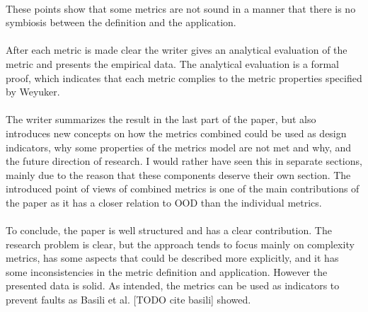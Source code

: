 \paragraph{}
These points show that some metrics are not sound in a manner that there is no symbiosis between the definition and
the application.

\paragraph{}
After each metric is made clear the writer gives an analytical evaluation of the metric and presents the empirical
data. The analytical evaluation is a formal proof, which indicates that each metric complies to the metric properties
specified by Weyuker.

\paragraph{}
The writer summarizes the result in the last part of the paper, but also introduces new concepts on how the metrics
combined could be used as design indicators, why some properties of the metrics model are not met and why, and the
future direction of research. I would rather have seen this in separate sections, mainly due to the reason that these
components deserve their own section. The introduced point of views of combined metrics is one of the main contributions
of the paper as it has a closer relation to OOD than the individual metrics.

\paragraph{}
To conclude, the paper is well structured and has a clear contribution. The research problem is clear, but the
approach tends to focus mainly on complexity metrics, has some aspects that could be described more explicitly, and it
has some inconsistencies in the metric definition and application. However the presented data is solid.
As intended, the metrics can be used as indicators to prevent faults as Basili et al. [TODO cite basili] showed.
